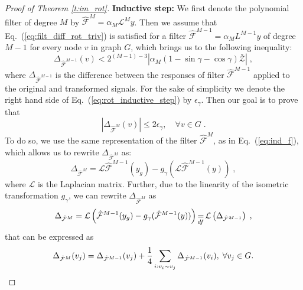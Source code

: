 \documentclass[10pt,journal,compsoc]{IEEEtran}
\newcommand{\df}{\mathop{=}\limits_{df}}
\newcommand{\hmF}{\hat{\mathcal{F}}}
\newcommand{\norm}[1]{\left|#1\right|}
\begin{document}
\begin{proof}[Proof of Theorem \ref{t:im_rot}]
		
		\textbf{Inductive step:} 
		We first denote the polynomial filter of degree $M$ by $\hmF^{M} = \alpha_M \mathcal{L}^{M} y$. Then we assume that Eq.~(\ref{eq:filt_diff_rot_triv}) is satisfied for a filter $\hmF^{M-1} = \alpha_M L^{M-1} y$ of degree $M-1$ for every node $v$ in graph $G$, which brings us to the following inequality:
		\begin{equation}
		\Delta_{\hmF^{M-1}} (v) < 2^{(M-1)-3}\norm{\alpha_M (1 - \sin\gamma - \cos\gamma) \bar{\mathcal{Z}}}\;,
		\label{eq:rot_inductive_step}
		\end{equation}
		\noindent
		where $\Delta_{\hmF^{M-1}}$ is the difference between the responses of filter $\hmF^{M-1}$ applied to the original and transformed signals. For the sake of simplicity we denote the right hand side of Eq.~(\ref{eq:rot_inductive_step}) by $\epsilon_\gamma$. Then our goal is to prove that 
		\begin{equation}
		\norm{\Delta_{\hmF^M} (v)} \leq 2 \epsilon_\gamma, \quad \forall v \in G\;.
		\end{equation}
		To do so, we use the same representation of the filter $\hmF^M$, as in Eq.~(\ref{eq:ind_f}), which allows us to rewrite $\Delta_{\hmF^M}$ as:
		\begin{equation}
		\Delta_{\hmF^{M}} = \mathcal{L} \hmF^{M-1}(y_g) - g_\gamma(\mathcal{L}\hmF^{M-1}(y)) \;,
		\end{equation}
		\noindent
		where $\mathcal{L}$ is the Laplacian matrix. Further, due to the linearity of the isometric transformation $g_\gamma$, we can rewrite $\Delta_{\hmF^{M}}$ as
		\begin{equation}
		\small
		\Delta_{\hmF^{M}} = \mathcal{L} \left(\hmF^{M-1}(y_g) - g_\gamma( \hmF^{M-1}(y))\right) \df \mathcal{L} \left(\Delta_{\hmF^{M-1}}\right)\;,
		\label{eq:ind_rot}
		\end{equation}
		\noindent
		that can be expressed as
		\begin{equation}
		\small
		\Delta_{\hmF^{M}} (v_j) = \Delta_{\hmF^{M-1}} (v_j) + \frac{1}{4} \sum\limits_{i: v_i \sim v_j} \Delta_{\hmF^{M-1}} (v_i), \; \forall v_j \in G.
		\label{eq:rot_fin_diff}
		\end{equation}

\end{proof}
\end{document}
